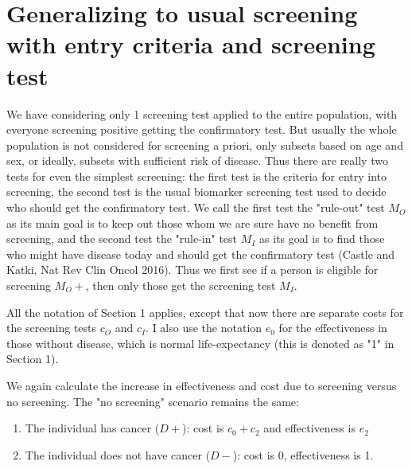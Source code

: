 \documentclass[11pt]{article}
\begin{document}
% 
% 

\section{Generalizing to usual screening with entry criteria and screening test}

We have considering only 1 screening test applied to the entire population, with everyone screening positive getting the confirmatory test.  But usually the whole population is not considered for screening a priori, only subsets based on age and sex, or ideally, subsets with sufficient risk of disease.  Thus there are really two tests for even the simplest screening: the first test is the criteria for entry into screening, the second test is the usual biomarker screening test used to decide who should get the confirmatory test.  We call the first test the "rule-out" test $M_O$ as its main goal is to keep out those whom we are sure have no benefit from screening, and the second test the "rule-in" test $M_I$ as its goal is to find those who might have disease today and should get the confirmatory test (Castle and Katki, Nat Rev Clin Oncol 2016).  Thus we first see if a person is eligible for screening $M_O+$, then only those get the screening test $M_I$.  

All the notation of Section 1 applies, except that now there are separate costs for the screening tests $c_O$ and $c_I$.  I also use the notation $e_0$ for the effectiveness in those without disease, which is normal life-expectancy (this is denoted as "1" in Section 1).  

We again calculate the increase in effectiveness and cost due to screening versus no screening.  The "no screening" scenario remains the same:
\begin{enumerate}
	\item{The individual has cancer ($D+$): cost is $c_0+c_2$ and effectiveness is $e_2$}
	\item{The individual does not have cancer ($D-$): cost is 0, effectiveness is 1.}
\end{enumerate}
\end{document}
